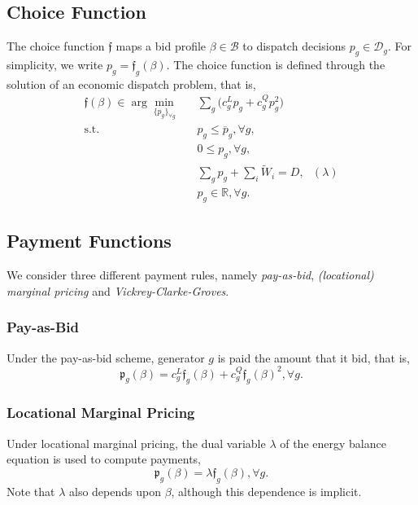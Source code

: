 \documentclass{article}
\begin{document}
\subsection{Choice Function}

The choice function $\mathfrak{f}$ maps a bid profile $\beta \in \mathcal{B}$ to dispatch decisions $p_g \in \mathcal{D}_g$. For simplicity, we write $p_g = \mathfrak{f}_g(\beta)$. The choice function is defined through the solution of an economic dispatch problem, that is,
\begin{align}
\mathfrak{f}(\beta) \in \arg \underset{\{p_g\}_{\forall g}}{\min} \hspace{10pt} & \sum_g \Big(c_g^Lp_g + c_g^Q p_g^2 \Big)\\
\mbox{s.t. } & p_g \le \overline{p}_g,\forall g,\\
& 0 \le p_g,\forall g,\\
& \sum_g p_g + \sum_i \tilde{W}_i = D, \mbox{ } (\lambda)\\
& p_g \in \mathbb{R}, \forall g.
\end{align}

\subsection{Payment Functions}

We consider three different payment rules, namely \textit{pay-as-bid}, \textit{(locational) marginal pricing} and \textit{Vickrey-Clarke-Groves}.

\subsubsection{Pay-as-Bid}

Under the pay-as-bid scheme, generator $g$ is paid the amount that it bid, that is,
\begin{equation*}
\mathfrak{p}_g(\beta) = c_g^L \mathfrak{f}_g(\beta) + c_g^Q \mathfrak{f}_g(\beta)^2, \forall g.
\end{equation*}

\subsubsection{Locational Marginal Pricing}

Under locational marginal pricing, the dual variable $\lambda$ of the energy balance equation is used to compute payments,
\begin{equation*}
\mathfrak{p}_g(\beta) = \lambda \mathfrak{f}_g(\beta), \forall g.
\end{equation*}
Note that $\lambda$ also depends upon $\beta$, although this dependence is implicit.
\end{document}
